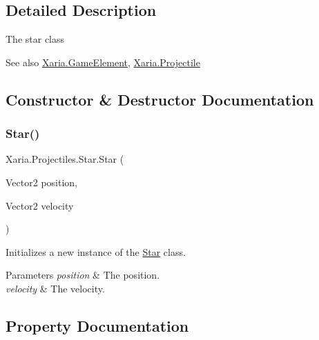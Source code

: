 \subsection{Detailed Description}
The star class 

\begin{DoxySeeAlso}{See also}
\hyperlink{classXaria_1_1GameElement}{Xaria.\+Game\+Element}, \hyperlink{classXaria_1_1Projectile}{Xaria.\+Projectile}


\end{DoxySeeAlso}


\subsection{Constructor \& Destructor Documentation}
\mbox{\label{classXaria_1_1Projectiles_1_1Star_a3dec66d134e721878d9a6c7207f7567b}} 
\subsubsection{\texorpdfstring{Star()}{Star()}}
{\footnotesize\ttfamily Xaria.\+Projectiles.\+Star.\+Star (\begin{DoxyParamCaption}\item[{Vector2}]{position,  }\item[{Vector2}]{velocity }\end{DoxyParamCaption})\hspace{0.3cm}{\ttfamily [inline]}}



Initializes a new instance of the \hyperlink{classXaria_1_1Projectiles_1_1Star}{Star} class. 


\begin{DoxyParams}{Parameters}
{\em position} & The position.\\
\hline
{\em velocity} & The velocity.\\
\hline
\end{DoxyParams}


\subsection{Property Documentation}
\mbox{\label{classXaria_1_1Projectiles_1_1Star_ac6cc10e6c07eadfe3a2c44133105dd38}} 

